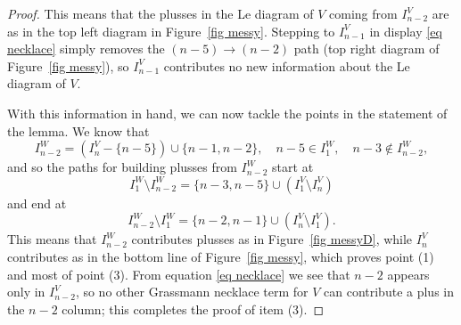 \documentclass[11pt]{article}
\theoremstyle{remark}
\theoremstyle{definition}
\begin{document}
\begin{proof}
  This means that the plusses in the Le diagram of $V$ coming from $I_{n-2}^{V}$ are as in the top left diagram in Figure~\ref{fig messy}.  Stepping to $I_{n-1}^{V}$ in display \eqref{eq necklace} simply removes the $(n-5)\rightarrow (n-2)$ path (top right diagram of Figure~\ref{fig messy}), so $I_{n-1}^V$ contributes no new information about the Le diagram of $V$.


  With this information in hand, we can now tackle the points in the statement of the lemma. We know that 
  \[I_{n-2}^{W}  = (I_{n}^{V} - \{n-5\})\cup \{n-1,n-2\}, \quad n-5 \in I_1^W, \quad n-3\not\in I_{n-2}^W,\]
 and so the paths for building plusses from $I_{n-2}^{W}$ start at
 \[I_1^W \setminus I_{n-2}^W = \{n-3,n-5\} \cup (I_1^V \setminus I_n^V)\]
 and end at
 \[I_{n-2}^W \setminus I_1^W = \{n-2,n-1\}\cup(I_n^V \setminus I_1^V).\]
This means that $I_{n-2}^W$ contributes plusses as in Figure~\ref{fig messyD}, while $I_n^V$ contributes as in the bottom line of Figure~\ref{fig messy}, which proves point (1) and most of point (3). From equation \eqref{eq necklace} we see that $n-2$ appears only in $I_{n-2}^V$, so no other Grassmann necklace term for $V$ can contribute a plus in the $n-2$ column; this completes the proof of item (3).


\end{proof}
\end{document}
